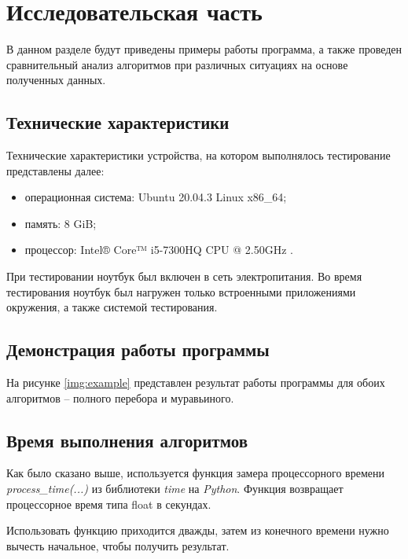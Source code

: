 \chapter{Исследовательская часть}

В данном разделе будут приведены примеры работы программа, а также проведен сравнительный анализ алгоритмов при различных ситуациях на основе полученных данных.

\section{Технические характеристики}

Технические характеристики устройства, на котором выполнялось тестирование представлены далее:

\begin{itemize}
    \item операционная система: Ubuntu 20.04.3 \cite{ubuntu} Linux \cite{linux} x86\_64;
    \item память: 8 GiB;
    \item процессор: Intel® Core™ i5-7300HQ CPU @ 2.50GHz \cite{intel}.
\end{itemize}

При тестировании ноутбук был включен в сеть электропитания. Во время тестирования ноутбук был нагружен только встроенными приложениями окружения, а также системой тестирования.

\section{Демонстрация работы программы}

На рисунке \ref{img:example} представлен результат работы программы для обоих алгоритмов -- полного перебора и муравьиного.

\clearpage

\section{Время выполнения алгоритмов}

Как было сказано выше, используется функция замера процессорного времени  \textit{process\_time(...)} из библиотеки \textit{time} на \textit{Python}. Функция возвращает процессорное время типа float в секундах.

Использовать функцию приходится дважды, затем из конечного времени нужно вычесть начальное, чтобы получить результат.

